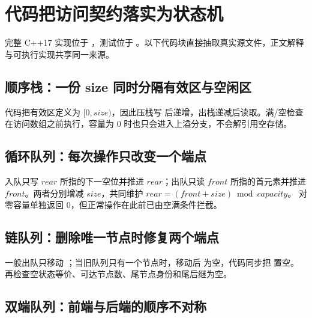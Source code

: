 \documentclass[UTF8,fontset=none,11pt,a4paper]{ctexart}
\begin{document}
\section{代码把访问契约落实为状态机}
完整 C++17 实现位于 ，测试位于 。以下代码块直接抽取真实源文件，正文解释与可执行实现共享同一来源。

\subsection{顺序栈：一份 size 同时分隔有效区与空闲区}


代码把有效区定义为 $[0,size)$，因此压栈写  后递增，出栈递减后读取。满/空检查在访问数组之前执行，容量为 0 时也只会进入上溢分支，不会解引用空存储。

\subsection{循环队列：每次操作只改变一个端点}


入队只写 $rear$ 所指的下一空位并推进 $rear$；出队只读 $front$ 所指的首元素并推进 $front$。两者分别增减 $size$，共同维护 $rear=(front+size)\bmod capacity$。 对零容量单独返回 0，但正常操作在此前已由空满条件拦截。

\subsection{链队列：删除唯一节点时修复两个端点}


一般出队只移动 ；当旧队列只有一个节点时，移动后  为空，代码同步把  置空。 再检查空状态等价、可达节点数、尾节点身份和尾后继为空。

\subsection{双端队列：前端与后端的顺序不对称}

\end{document}
